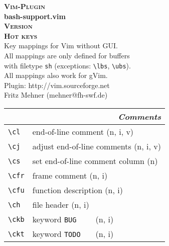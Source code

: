 \documentclass[oneside,12pt,a4paper,DIV18]{scrartcl}
\begin{document}
\begin{center}
\textbf{\textsc{\small{Vim-Plugin}}}\\
\textbf{\huge{bash-support.vim}}\\
\textbf{\textsc{\small{Version \PluginVersion}}}\\
\vspace{3mm}%
\textbf{\textsc{\LARGE{Hot keys}}}\\ 
\vspace{3mm}%
\footnotesize{Key mappings for Vim without GUI.}\\
\vspace{1mm}%
\footnotesize{
All mappings are only defined for buffers\\
with filetype \texttt{sh} (exceptions: \verb'\lbs',  \verb'\ubs').\\
All mappings also work for gVim.}\\ 
\vspace{1mm}%
\footnotesize{Plugin: http://vim.sourceforge.net}\\
\footnotesize{Fritz Mehner (mehner@fh-swf.de)}\\
\vspace{3.5mm}
\small
\begin{tabular}[]{|p{11mm}|p{59mm}|}
\hline
\multicolumn{2}{|r|}{\textsl{\textbf{C}omments}}\\
\hline \verb'\cl'  & end-of-line comment              \hfill (n, i, v)\\
\hline \verb'\cj'  & adjust end-of-line comments      \hfill (n, i, v)\\
\hline \verb'\cs'  & set end-of-line comment column   \hfill (n)\\
\hline \verb'\cfr' & frame comment                    \hfill (n, i)\\
\hline \verb'\cfu' & function description             \hfill (n, i)\\
\hline \verb'\ch'  & file header                      \hfill (n, i)\\
\hline \verb'\ckb' & keyword \verb'BUG    '           \hfill (n, i)\\
\hline \verb'\ckt' & keyword \verb'TODO   '           \hfill (n, i)\\

\end{tabular}
\end{center}
\end{document}
